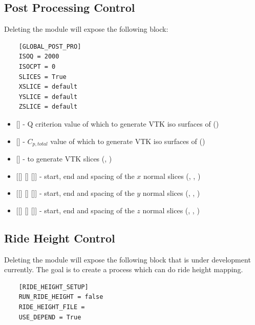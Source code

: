 \subsection{Post Processing Control}
Deleting the module  will expose the following block:
\begin{lstlisting}
    [GLOBAL_POST_PRO]
    ISOQ = 2000
    ISOCPT = 0
    SLICES = True
    XSLICE = default
    YSLICE = default
    ZSLICE = default
\end{lstlisting}

\begin{itemize}
    \item {} [] - Q criterion value of which to generate VTK iso surfaces of ()
    
    \item {} [] - \(C_{p,total}\) value of which to generate VTK iso surfaces of ()
    
    \item {} [] - to generate VTK slices (, )
    
    \item {} [[] [] []] - start, end and spacing of the \(x\) normal slices (, , )
    
    \item {} [[] [] []] - start, end and spacing of the \(y\) normal slices (, , )
    
    \item {} [[] [] []] - start, end and spacing of the \(z\) normal slices (, , )
\end{itemize}

\subsection{Ride Height Control}
Deleting the module  will expose the following block that is under development currently. The goal is to create a process which can do ride height mapping.
\begin{lstlisting}
    [RIDE_HEIGHT_SETUP]
    RUN_RIDE_HEIGHT = false
    RIDE_HEIGHT_FILE =
    USE_DEPEND = True
\end{lstlisting}

